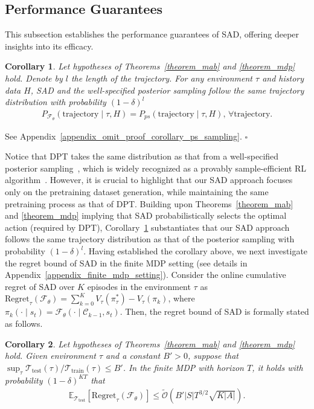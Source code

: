 \documentclass[10pt]{article}
\newtheorem{corollary}{Corollary}
\newenvironment{myproof}{{\noindent\it Proof. }}{\hfill $\square$ \par}
\def\mbE{{\ensuremath{\mathbb E}}}
\def\ccalC{{\ensuremath{\mathcal C}}}
\def\ccalF{{\ensuremath{\mathcal F}}}
\def\ccalO{{\ensuremath{\mathcal O}}}
\def\ccalT{{\ensuremath{\mathcal T}}}
\begin{document}
\subsection{Performance Guarantees}
This subsection establishes the performance guarantees of SAD, offering deeper insights into its efficacy.
\begin{corollary}
\label{corollary_ps_sampling}
Let hypotheses of Theorems~\ref{theorem_mab}  and \ref{theorem_mdp} hold. Denote by $l$ the length of the trajectory.
For any environment $\tau$ and history data $H$, SAD and the well-specified posterior sampling follow the same trajectory distribution with probability $(1-\delta)^l$
\begin{align}
    P_{\ccalF_{\theta}} (\text{trajectory}  \mid  \tau, H) = P_{ps}(\text{trajectory} \mid \tau, H), \, \forall \text{trajectory}.
\end{align}
\end{corollary}
\begin{myproof}
    See Appendix~\ref{appendix_omit_proof_corollary_ps_sampling}.
\end{myproof}
Notice that DPT takes the same distribution as that from a well-specified posterior sampling~\citep{lee2024supervised}, which is widely recognized as a provably sample-efficient RL algorithm~\citep{osband2013more}.
However, it is crucial to highlight that our SAD approach focuses only on the pretraining dataset generation, while maintaining the same pretraining process as that of DPT. Building upon Theorems~\ref{theorem_mab} and \ref{theorem_mdp} implying that SAD probabilistically selects the optimal action (required by DPT), Corollary~\ref{corollary_ps_sampling} substantiates that our SAD approach follows the same trajectory distribution as that of the posterior sampling with probability $(1-\delta)^l$.
Having established the corollary above, we next investigate the regret bound of SAD in the finite MDP setting (see details in Appendix~\ref{appendix_finite_mdp_setting}).
Consider the online cumulative regret of SAD over $K$ episodes in the environment $\tau$ as $\text{Regret}_\tau(\ccalF_{\theta}) = \sum_{k=0}^K V_\tau (\pi_\tau^*) - V_\tau(\pi_k)$, where $\pi_k (\cdot \mid s_t) = \ccalF_{\theta}(\cdot \mid \ccalC_{k-1}, s_t)$.
Then, the regret bound of SAD is formally stated as follows.
\begin{corollary}
\label{corollary_regret_bound}
Let hypotheses of Theorems~\ref{theorem_mab} and \ref{theorem_mdp} hold.
Given environment $\tau$ and a constant $B' > 0$, suppose that $\sup_{\tau} {\ccalT_{\text{test}}(\tau)}/{\ccalT_{\text{train}}(\tau)} \leq B'$. In the finite MDP with horizon $T$, it holds with probability $(1-\delta)^{KT}$ that
\begin{align}
       \mbE_{\ccalT_{\text{test}}} \left[ \text{Regret}_\tau(\ccalF_{\theta}) \right]  \leq \widetilde{\ccalO} (B' |S| T^{3/2} \sqrt{K |A|}). \label{eqn_regret_bound}
\end{align}
\end{corollary}
\end{document}
